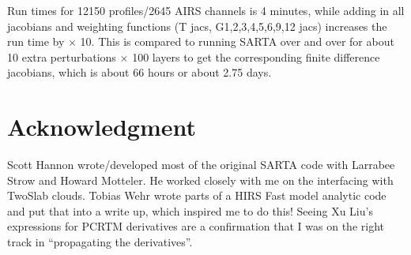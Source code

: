 \documentclass[11pt]{article}
\newcommand{\sa}{\textsf{SARTA}\xspace}
\begin{document}
Run times for 12150 profiles/2645 AIRS channels is 4 minutes, while
adding in all jacobians and weighting functions (T jacs,
G1,2,3,4,5,6,9,12 jacs) increases the run time by $\times$ 10. This is
compared to running \sa over and over for about 10 extra
perturbations $\times$ 100 layers to get the corresponding finite
difference jacobians, which is about 66 hours or about 2.75 days.

\section{Acknowledgment}
Scott Hannon wrote/developed most of the original \sa code with
Larrabee Strow and Howard Motteler. He worked closely with me on the
interfacing with TwoSlab clouds. Tobias Wehr wrote parts of a HIRS
Fast model analytic code and put that into a write up, which inspired
me to do this! Seeing Xu Liu's expressions for PCRTM derivatives are a
confirmation that I was on the right track in ``propagating the
derivatives''.



\end{document}

